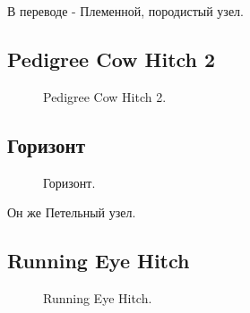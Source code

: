В переводе - Племенной, породистый узел.

\subsection{Pedigree Cow Hitch 2}

\begin{figure}[H]\centering
	\begin{minipage}{1\linewidth}
		\begin{center}
			\tcbox[enhanced jigsaw,colframe=black,opacityframe=0.5,opacityback=0.5]
			{\centering{}}
		\end{center}
	\end{minipage}
\caption{Pedigree Cow Hitch 2.}
\label{ris:Pedigree_Cow_Hitch_2}
\end{figure}

\subsection{Горизонт}

\begin{figure}[H]\centering
	\begin{minipage}{1\linewidth}
		\begin{center}
			\tcbox[enhanced jigsaw,colframe=black,opacityframe=0.5,opacityback=0.5]
			{\centering{}}
		\end{center}
	\end{minipage}
\caption{Горизонт.}
\label{ris:Horizon}
\end{figure}

Он же Петельный узел.

\subsection{Running Eye Hitch}

\begin{figure}[H]\centering
	\begin{minipage}{1\linewidth}
		\begin{center}
			\tcbox[enhanced jigsaw,colframe=black,opacityframe=0.5,opacityback=0.5]
			{\centering{}}
		\end{center}
	\end{minipage}
\caption{Running Eye Hitch.}
\label{ris:Running_Eye_Hitch}
\end{figure}

